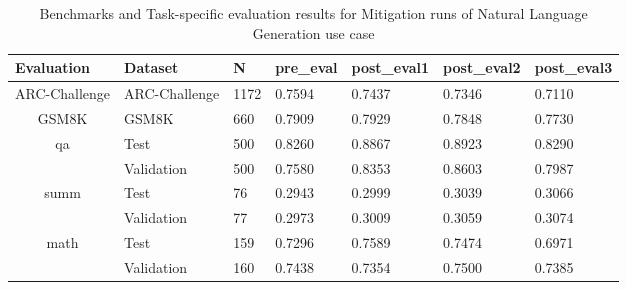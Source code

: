 \begin{table}[H]
\centering
\caption{Benchmarks and Task-specific evaluation results for Mitigation runs of Natural Language Generation use case}
\begin{tabular}{|c|l|l|l|l|l|l|}
\hline
\multicolumn{1}{|l|}{Evaluation} & Dataset       & N & pre\_eval & post\_eval1 & post\_eval2 & post\_eval3 \\ \hline
ARC-Challenge                    & ARC-Challenge & 1172            & 0.7594    & 0.7437      & 0.7346      & 0.7110      \\ \hline
GSM8K                            & GSM8K         & 660             & 0.7909    & 0.7929      & 0.7848      & 0.7730      \\ \hline
\multirow{2}{*}{qa}              & Test          & 500             & 0.8260    & 0.8867      & 0.8923      & 0.8290      \\ \cline{2-7} 
                                 & Validation    & 500             & 0.7580    & 0.8353      & 0.8603      & 0.7987      \\ \hline
\multirow{2}{*}{summ}            & Test          & 76              & 0.2943    & 0.2999      & 0.3039      & 0.3066      \\ \cline{2-7} 
                                 & Validation    & 77              & 0.2973    & 0.3009      & 0.3059      & 0.3074      \\ \hline
\multirow{2}{*}{math}            & Test          & 159             & 0.7296    & 0.7589      & 0.7474      & 0.6971      \\ \cline{2-7} 
                                 & Validation    & 160             & 0.7438    & 0.7354      & 0.7500      & 0.7385      \\ \hline
\end{tabular}
\label{tab:TraceMitigationCombined}
\end{table}